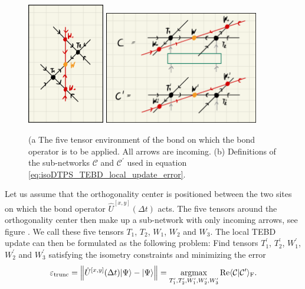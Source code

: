 \begin{figure}
	\centering
	\subcaptionbox{\label{fig:disoTPS_TEBD_five_tensor_environment}}
	{%
		\includegraphics[width=0.3\textwidth]{figures/disoTPS/disoTPS_TEBD_5_tensor_environment.jpeg}
	}
	\subcaptionbox{\label{fig:disoTPS_TEBD_contraction_definition}}
	{%
		\includegraphics[width=0.6\textwidth]{figures/disoTPS/disoTPS_TEBD_contraction_definitions.jpeg}
	}
	\caption{(a The five tensor environment of the bond on which the bond operator is to be applied. All arrows are incoming. (b) Definitions of the sub-networks $\mathcal{C}$ and $\mathcal{C}^\prime$ used in equation \eqref{eq:isoDTPS_TEBD_local_update_error}.}
	\label{fig:disoTPS_TEBD_definition_of_environment}
\end{figure}
Let us assume that the orthogonality center is positioned between the two sites on which the bond operator $\hat{U}^{[x, y]}\left(\Delta t\right)$ acts. The five tensors around the orthogonality center then make up a sub-network with only incoming arrows, see figure . We call these five tensors $T_1$, $T_2$, $W_1$, $W_2$ and $W_3$. The local TEBD update can then be formulated as the following problem: Find tensors $T_1^\prime$, $T_2^\prime$, $W_1^\prime$, $W_2^\prime$ and $W_3^\prime$ satisfying the isometry constraints and minimizing the error
\begin{equation}
	\label{eq:isoDTPS_TEBD_local_update_error}
	\varepsilon_\text{trunc} = \left\lVert \hat{U}^{[x,y]}(\Delta t)|\Psi\rangle - |\Psi\rangle\right\rVert = \underset{T_1^\prime, T_2^\prime, W_1^\prime, W_2^\prime, W_3^\prime}{\operatorname{argmax}}\operatorname{Re}\langle\mathcal{C}|\mathcal{C}^\prime\rangle_\text{F}.
\end{equation}
